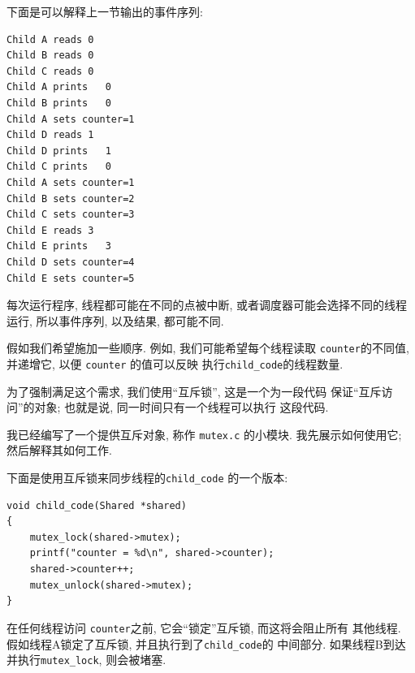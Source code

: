 \documentclass[12pt]{book}
\begin{document}
{%
下面是可以解释上一节输出的事件序列:

\begin{verbatim}
Child A reads 0
Child B reads 0
Child C reads 0
Child A prints   0
Child B prints   0
Child A sets counter=1
Child D reads 1
Child D prints   1
Child C prints   0
Child A sets counter=1
Child B sets counter=2
Child C sets counter=3
Child E reads 3
Child E prints   3
Child D sets counter=4
Child E sets counter=5
\end{verbatim}

每次运行程序, 线程都可能在不同的点被中断, 
或者调度器可能会选择不同的线程运行, 所以事件序列, 以及结果,
都可能不同.

假如我们希望施加一些顺序. 例如, 我们可能希望每个线程读取
 {\tt counter}的不同值, 并递增它, 以便 {\tt counter} 的值可以反映
 执行\verb"child_code"的线程数量.

为了强制满足这个需求, 我们使用``互斥锁'', 这是一个为一段代码
保证``互斥访问''的对象; 也就是说, 同一时间只有一个线程可以执行
这段代码.  

我已经编写了一个提供互斥对象, 称作 {\tt mutex.c} 的小模块. 
我先展示如何使用它; 然后解释其如何工作.

下面是使用互斥锁来同步线程的\verb"child_code" 的一个版本: 

\begin{verbatim}
void child_code(Shared *shared)
{
    mutex_lock(shared->mutex);
    printf("counter = %d\n", shared->counter);
    shared->counter++;
    mutex_unlock(shared->mutex);
}
\end{verbatim}

在任何线程访问 {\tt counter}之前, 它会``锁定''互斥锁, 而这将会阻止所有
其他线程. 假如线程A锁定了互斥锁, 并且执行到了\verb"child_code"的
中间部分. 如果线程B到达并执行\verb"mutex_lock", 则会被堵塞.

}
\end{document}
